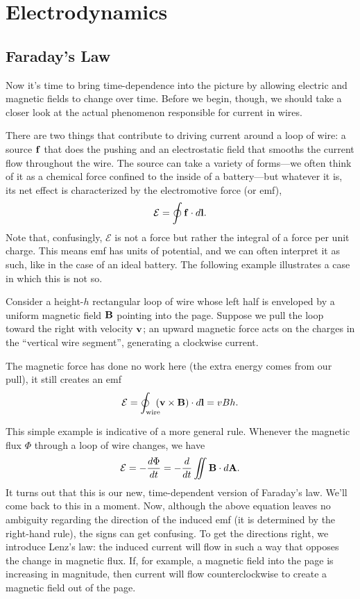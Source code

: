 \documentclass[../p051main.tex]{subfiles}
\begin{document}
\chapter{Electrodynamics}
\section{Faraday's Law}
Now it's time to bring time-dependence into the picture by allowing electric and magnetic fields to change over time.
Before we begin, though, we should take a closer look at the actual phenomenon responsible for current in wires.

There are two things that contribute to driving current around a loop of wire: a source $\mathbf{f}$ that does the pushing and an electrostatic field that smooths the current flow throughout the wire.
The source can take a variety of forms---we often think of it as a chemical force confined to the inside of a battery---but whatever it is, its net effect is characterized by the electromotive force (or emf),
\[ \mathcal{E} = \oint \mathbf{f} \cdot d\mathbf{l}. \]
Note that, confusingly, $\mathcal{E}$ is not a force but rather the integral of a force per unit charge.
This means emf has units of potential, and we can often interpret it as such, like in the case of an ideal battery.
The following example illustrates a case in which this is not so.

\begin{example}
    Consider a height-$h$ rectangular loop of wire whose left half is enveloped by a uniform magnetic field $\mathbf{B}$ pointing into the page.
    Suppose we pull the loop toward the right with velocity $\mathbf{v}$; an upward magnetic force acts on the charges in the ``vertical wire segment'', generating a clockwise current.

    The magnetic force has done no work here (the extra energy comes from our pull), it still creates an emf
    \[ \mathcal{E} = \oint_\textrm{wire} \hspace{-5pt} (\mathbf{v} \times \mathbf{B}) \cdot d\mathbf{l} = vBh. \]
\end{example}

This simple example is indicative of a more general rule.
Whenever the magnetic flux $\Phi$ through a loop of wire changes, we have
\[ \mathcal{E} = -\frac{d\Phi}{dt} = -\frac{d}{dt} \iint \mathbf{B} \cdot d\mathbf{A}. \]
It turns out that this is our new, time-dependent version of Faraday's law.
We'll come back to this in a moment.
Now, although the above equation leaves no ambiguity regarding the direction of the induced emf (it is determined by the right-hand rule), the signs can get confusing.
To get the directions right, we introduce Lenz's law: the induced current will flow in such a way that opposes the change in magnetic flux.
If, for example, a magnetic field into the page is increasing in magnitude, then current will flow counterclockwise to create a magnetic field out of the page.
\end{document}
